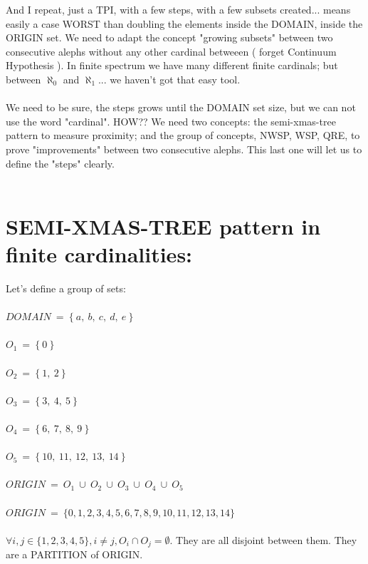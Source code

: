 		\noindent
		And I repeat, just a TPI, with a few steps, with a few subsets created... means easily a case WORST than doubling the elements inside the DOMAIN, inside the ORIGIN set. We need to adapt the concept "growing subsets" between two consecutive alephs without any other cardinal betweeen ( forget Continuum Hypothesis ). In finite spectrum we have many different finite cardinals; but between $\aleph_{0}$ and $\aleph_{1}$... we haven't got that easy tool.
		\\\\
		
		\noindent
		We need to be sure, the steps grows until the DOMAIN set size, but we can not use the word "cardinal". HOW?? We need two concepts: the semi-xmas-tree pattern to measure proximity; and the group of concepts, NWSP, WSP, QRE, to prove "improvements" between two consecutive alephs. This last one will let us to define the "steps" clearly.
		\\\\
	
	
	\newpage	
	\section{SEMI-XMAS-TREE pattern in finite cardinalities:}
	
		\noindent
		Let's define a group of sets:\\\\
		$DOMAIN \: = \: \{ \: a, \: b, \: c, \: d, \: e \:\}$\\\\
		$O_{1} \: = \: \{ \: 0 \:\}$\\\\ 
		$O_{2} \: = \: \{ \: 1, \: 2 \: \}$\\\\ 
		$O_{3} \: = \: \{ \: 3, \: 4, \: 5 \: \}$\\\\ 
		$O_{4} \: = \: \{ \: 6, \: 7, \: 8, \: 9 \: \}$\\\\ 
		$O_{5} \: = \: \{ \: 10, \: 11, \: 12, \: 13, \: 14 \: \}$\\\\
		$ORIGIN \: = \: O_{1} \: \cup \: O_{2} \: \cup \: O_{3} \: \cup \: O_{4} \: \cup \: O_{5}$\\\\
		$ORIGIN \: = \: \{ 0,1,2,3,4,5,6,7,8,9,10,11,12,13,14 \}$\\\\
		$ \forall i,j \in \{1,2,3,4,5\}, i \neq j,  O_{i} \cap O_{j}  = \emptyset $. They are all disjoint between them. They are a PARTITION of ORIGIN.
		\\\\
		
